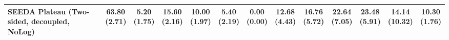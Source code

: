 \begin{table}[H]
{\begin{tabular}{l|cccccc|cccccc}
SEEDA Plateau (Two-sided, decoupled, NoLog) & \bfseries \makecell{63.80 \\ (2.71)} & \makecell{5.20 \\ (1.75)} & {\cellcolor[HTML]{C8E6C9}} \makecell{15.60 \\ (2.16)} & \makecell{10.00 \\ (1.97)} & \makecell{5.40 \\ (2.19)} & \makecell{0.00 \\ (0.00)} & \makecell{12.68 \\ (4.43)} & \makecell{16.76 \\ (5.72)} & {\cellcolor[HTML]{C8E6C9}} \makecell{22.64 \\ (7.05)} & \bfseries \makecell{23.48 \\ (5.91)} & \makecell{14.14 \\ (10.32)} & \makecell{10.30 \\ (1.76)} \\
\bottomrule
\end{tabular}
}%
\end{table}
